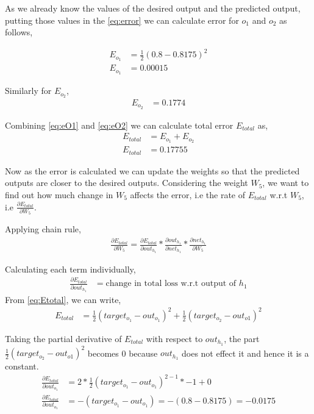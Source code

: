 As we already know the values of the desired output and the predicted output, putting those values in the \ref{eq:error} we can calculate error for $o_{1}$ and $o_{2}$ as follows,

\begin{align}
    E_{o_{1}} &= \frac{1}{2} (0.8-0.8175)^{2}\\
    E_{o_{1}} &= 0.00015  \label{eq:eO1}
\end{align}

Similarly for $E_{o_{2}}$,
\begin{align}\label{eq:eO2}
    E_{o_{2}} &= 0.1774
\end{align}

Combining \ref{eq:eO1} and \ref{eq:eO2} we can calculate total error $E_{total}$ as,
\begin{align}
    E_{total} &= E_{o_{1}} + E_{o_{2}} \label{eq:Etotal}\\
    E_{total} &= 0.17755
\end{align}

Now as the error is calculated we can update the weights so that the predicted outputs are closer to the desired outputs.
Considering the weight $W_{5}$, we want to find out how much change in $W_{5}$ affects the error, i.e the rate of $E_{total}$ w.r.t $W_{5}$, i.e $\frac{\partial E_{total} }{\partial W_{5}}$. 

Applying chain rule, 
\begin{align}
    \frac{\partial E_{total} }{\partial W_{5}} = \frac{\partial E_{total} }{\partial out_{h_{1}}} * \frac{\partial out_{h_{1}} }{\partial net_{h_{1}}} *  \frac{\partial net_{h_{1}} }{\partial W_{5}} \label{eq:backpropMain}
\end{align}

Calculating each term individually,
\begin{align}
    \frac{\partial E_{total} }{\partial out_{h_{1}}} &= \text{change in total loss w.r.t output of $h_{1}$}
\end{align}
From \ref{eq:Etotal}, we can write,
\begin{align}
    E_{total} &= \frac{1}{2}(target_{o_{1}} - out_{o_{1}})^{2} + \frac{1}{2}(target_{o_{2}} - out_{o{1}})^{2}
\end{align}

Taking the partial derivative of $E_{total}$ with respect to $out_{h_{1}}$, the part $\frac{1}{2}(target_{o_{2}} - out_{o{1}})^{2}$ becomes 0 because $out_{h_{1}}$ does not effect it and hence it is a constant.
\begin{align}
    \frac{\partial E_{total}}{\partial out_{o_{1}}} &= 2 * \frac{1}{2}(target_{o_{1}} - out_{o_{1}})^{2 - 1} * -1 + 0\\
    \frac{\partial E_{total}}{\partial out_{o_{1}}} &= -(target_{o_{1}} - out_{o_{1}}) = -(0.8 - 0.8175) = -0.0175 \label{eq:Backprop_2}
\end{align}

